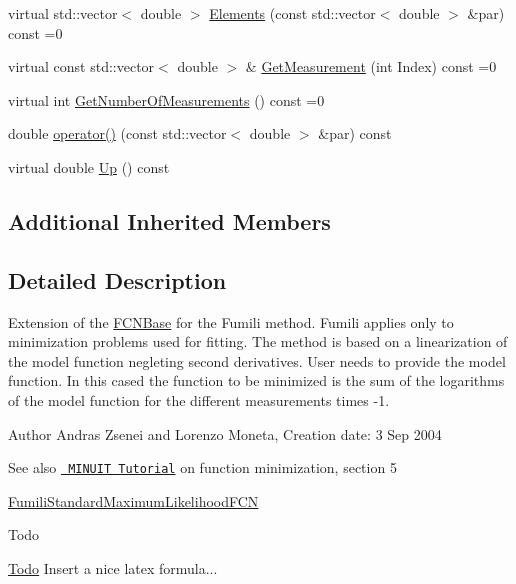 \begin{DoxyCompactItemize}
\item 
virtual std\+::vector$<$ double $>$ \mbox{\hyperlink{classROOT_1_1Minuit2_1_1FumiliMaximumLikelihoodFCN_a20aa81dc23ba61ed49ba78f4f9627e59}{Elements}} (const std\+::vector$<$ double $>$ \&par) const =0
\item 
virtual const std\+::vector$<$ double $>$ \& \mbox{\hyperlink{classROOT_1_1Minuit2_1_1FumiliMaximumLikelihoodFCN_ac3e28c8d3e14a1df3145891ae99ac35d}{Get\+Measurement}} (int Index) const =0
\item 
virtual int \mbox{\hyperlink{classROOT_1_1Minuit2_1_1FumiliMaximumLikelihoodFCN_af0a6b5a302f978363074039c7d55d529}{Get\+Number\+Of\+Measurements}} () const =0
\item 
double \mbox{\hyperlink{classROOT_1_1Minuit2_1_1FumiliMaximumLikelihoodFCN_ad06826a1cde84be6bf2a13518c768ca5}{operator()}} (const std\+::vector$<$ double $>$ \&par) const
\item 
virtual double \mbox{\hyperlink{classROOT_1_1Minuit2_1_1FumiliMaximumLikelihoodFCN_ab945da701895bfba143da08f76ba2d05}{Up}} () const
\end{DoxyCompactItemize}
\subsection*{Additional Inherited Members}


\subsection{Detailed Description}
Extension of the \mbox{\hyperlink{classROOT_1_1Minuit2_1_1FCNBase}{F\+C\+N\+Base}} for the Fumili method. Fumili applies only to minimization problems used for fitting. The method is based on a linearization of the model function negleting second derivatives. User needs to provide the model function. In this cased the function to be minimized is the sum of the logarithms of the model function for the different measurements times -\/1.

\begin{DoxyAuthor}{Author}
Andras Zsenei and Lorenzo Moneta, Creation date\+: 3 Sep 2004
\end{DoxyAuthor}
\begin{DoxySeeAlso}{See also}
\href{http://www.cern.ch/winkler/minuit/tutorial/mntutorial.pdf}{\texttt{ M\+I\+N\+U\+IT Tutorial}} on function minimization, section 5

\mbox{\hyperlink{classROOT_1_1Minuit2_1_1FumiliStandardMaximumLikelihoodFCN}{Fumili\+Standard\+Maximum\+Likelihood\+F\+CN}}
\end{DoxySeeAlso}
\begin{DoxyRefDesc}{Todo}
\item[\mbox{\hyperlink{todo__todo000008}{Todo}}]Insert a nice latex formula...\end{DoxyRefDesc}



